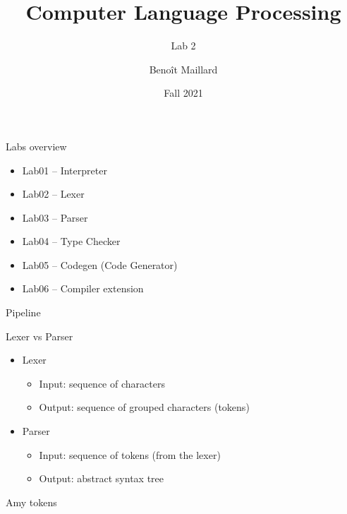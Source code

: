 \documentclass{beamer}
\title{Computer Language Processing}
\subtitle{Lab 2}
\author{Benoît Maillard}
\date{Fall 2021}
\begin{document}
    \frame{\titlepage}


    \begin{frame}{Labs overview}
        \begin{itemize}
            \item Lab01 -- Interpreter
            \item Lab02 -- Lexer
            \item Lab03 -- Parser
            \item Lab04 -- Type Checker
            \item Lab05 -- Codegen (Code Generator)
            \item Lab06 -- Compiler extension
        \end{itemize}
    \end{frame}

    \begin{frame}{Pipeline}
        \centering
    \end{frame}

    \begin{frame}[fragile]{Lexer vs Parser}
        \begin{itemize}
            \item Lexer
            \begin{itemize}
                \item Input: sequence of characters
                \item Output: sequence of grouped characters (tokens)
            \end{itemize}
            \item Parser
            \begin{itemize}
                \item Input: sequence of tokens (from the lexer)
                \item Output: abstract syntax tree 
            \end{itemize}
        \end{itemize}

    \end{frame}

    \begin{frame}{Amy tokens}
    \end{frame}
\end{document}
